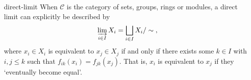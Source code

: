 \begin{example}{direct-limit}
    When $\mathcal{C}$ is the category of sets, groups, rings or modules, a direct limit can     explicitly be described by
    \[ \varinjlim_{i \in I} X_i = \bigsqcup_{i \in I} X_i / \sim{} , \]
    where $x_i \in X_i$ is equivalent to $x_j \in X_j$ if and only if there exists some $k \in I$ with $i, j \le k$ such that $f_{ik}(x_i) = f_{jk}(x_j)$. That is, $x_i$ is equivalent to $x_j$ if they `eventually become equal'.
\end{example}
